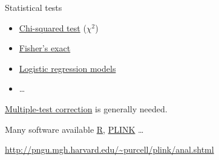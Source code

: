 \begin{frame}{Statistical tests}

\begin{itemize}
\itemsep1pt\parskip0pt
\item
  \href{http://en.wikipedia.org/wiki/Chi-squared_test}{Chi-squared test}
  (\(\chi^2\))
\item
  \href{http://en.wikipedia.org/wiki/Fisher's_exact_test}{Fisher's
  exact}
\item
  \href{http://en.wikipedia.org/wiki/Logistic_regression}{Logistic
  regression models}
\item
  \ldots{}
\end{itemize}

\href{http://www.ncbi.nlm.nih.gov/pmc/articles/PMC2907892/}{Multiple-test
correction} is generally needed.

Many software available \href{http://cran.es.r-project.org/}{R},
\href{http://pngu.mgh.harvard.edu/~purcell/plink/}{PLINK} \ldots{}

\url{http://pngu.mgh.harvard.edu/~purcell/plink/anal.shtml}

\end{frame}
